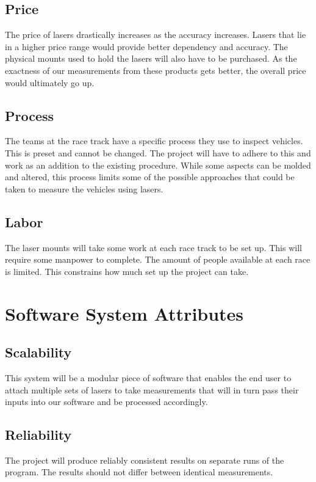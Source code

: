 \documentclass[draftclsnofoot,onecolumn,letterpaper,10pt,compsoc]{IEEEtran}
\begin{document}
\subsection{Price}
The price of lasers drastically increases as the accuracy increases.  Lasers that lie in a higher price range would provide better dependency and accuracy.  The physical mounts used to hold the lasers will also have to be purchased.  As the exactness of our measurements from these products gets better, the overall price would ultimately go up.
\subsection{Process}
The teams at the race track have a specific process they use to inspect vehicles.  This is preset and cannot be changed.  The project will have to adhere to this and work as an addition to the existing procedure. While some aspects can be molded and altered, this process limits some of the possible approaches that could be taken to measure the vehicles using lasers.
\subsection{Labor}
The laser mounts will take some work at each race track to be set up.  This will require some manpower to complete.  The amount of people available at each race is limited.  This constrains how much set up the project can take.

\section{Software System Attributes}
\subsection{Scalability}
This system will be a modular piece of software that enables the end user to attach multiple sets of lasers to take measurements that will in turn pass their inputs into our software and be processed accordingly.
\subsection{Reliability}
The project will produce reliably consistent results on separate runs of the program.  The results should not differ between identical measurements.

\clearpage



\end{document}
